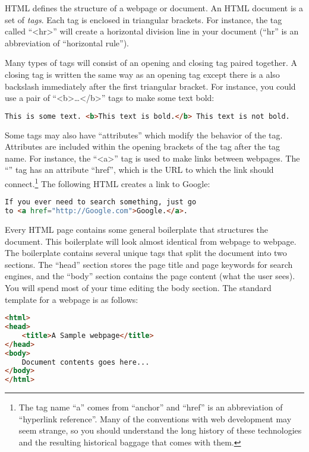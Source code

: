 \documentclass[]{memoir}
\begin{document}
HTML defines the structure of a webpage or document. An HTML document is
a set of \emph{tags}. Each tag is enclosed in triangular brackets. For
instance, the tag called ``\textless{}hr\textgreater{}'' will create a
horizontal division line in your document (``hr'' is an abbreviation of
``horizontal rule'').

Many types of tags will consist of an opening and closing tag paired
together. A closing tag is written the same way as an opening tag except
there is a also backslash immediately after the first triangular
bracket. For instance, you could use a pair of
``\textless{}b\textgreater{}\ldots{}\textless{}/b\textgreater{}'' tags
to make some text bold:

\begin{lstlisting}[language=HTML]
This is some text. <b>This text is bold.</b> This text is not bold.
\end{lstlisting}

Some tags may also have ``attributes'' which modify the behavior of the
tag. Attributes are included within the opening brackets of the tag
after the tag name. For instance, the ``\textless{}a\textgreater{}'' tag
is used to make links between webpages. The ``'' tag has an attribute
``href'', which is the URL to which the link should connect.\footnote{The
  tag name ``a'' comes from ``anchor'' and ``href'' is an abbreviation
  of ``hyperlink reference''. Many of the conventions with web
  development may seem strange, so you should understand the long
  history of these technologies and the resulting historical baggage
  that comes with them.} The following HTML creates a link to Google:

\begin{lstlisting}[language=HTML]
If you ever need to search something, just go
to <a href="http://Google.com">Google.</a>.
\end{lstlisting}

Every HTML page contains some general boilerplate that structures the
document. This boilerplate will look almost identical from webpage to
webpage. The boilerplate contains several unique tags that split the
document into two sections. The ``head'' section stores the page title
and page keywords for search engines, and the ``body'' section contains
the page content (what the user sees). You will spend most of your time
editing the body section. The standard template for a webpage is as
follows:

\begin{lstlisting}[language=HTML]
<html>
<head>
    <title>A Sample webpage</title>
</head>
<body>
    Document contents goes here...
</body>
</html>
\end{lstlisting}
\end{document}
